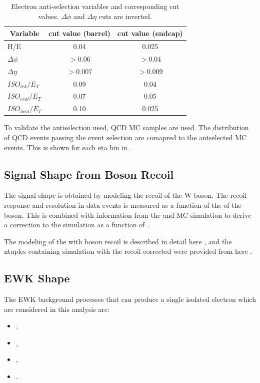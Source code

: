 \begin{table}[htbp]
  \begin{center}
    \leavevmode
    \begin{tabular}{lcc} 
    \toprule
      \multicolumn{1}{c}{Variable} & \multicolumn{1}{c}{cut value (barrel)}& \multicolumn{1}{c}{cut value (endcap)}\\\midrule
        H/E & 0.04 & 0.025 \\
        $\Delta\phi$ & $>0.06$  & $>0.04$ \\
        $\Delta\eta$ & $>0.007$ & $>0.009$\\
        $ISO_{trk} / E_T $ & 0.09 & 0.04 \\
        $ISO_{ecal}/ E_T$  & 0.07 & 0.05 \\
        $ISO_{hcal}/ E_T$  & 0.10 & 0.025\\ 
    \bottomrule
    \end{tabular}
    \caption{\label{tab:AScuts}Electron anti-selection variables and corresponding cut values. $\Delta\phi$ and $\Delta\eta$ cuts are inverted.}
  \end{center}
\end{table}

To validate the antiselection used, \ac{QCD} \ac{MC} samples are used. The
distribution of \ac{QCD} events passing the event selection are comapred to the
antselected MC events. This is shown for each eta bin in
.

\subsection{Signal \ETm Shape from Boson Recoil}
The signal \ETm shape is obtained by modeling the recoil of the W boson. 
The recoil response and resolution in \HepProcess{\PZ\to\Plepton\Plepton} data
events is measured as a function of the \pT of the boson. This is combined with
information from the \PW and \PZ \ac{MC} simulation to derive a correction to
the simulation \ETm as a function of \PW \pT.

The modeling of the \HepProcess{\PW\to\Plepton\Pnu} \ETm with boson recoil is
described in detail here \cite{NULL}, and the ntuples containing
\HepProcess{\PW\to\Pelectron\Pnu} simulation with the recoil corrected \ETm were
provided from here \cite{NULL}.


\subsection{\ac{EWK} \ETm Shape}
The EWK background processes that can produce a single isolated
electron which are considered in this analysis are:
\begin{itemize}
\item \HepProcess{\PZ\to\Pelectron\APelectron},
\item \HepProcess{\PZ\to\Ptauon\APtauon},
\item \HepProcess{\PW\to\Ptau\Pnu},
\item \HepProcess{\Ptop\APtop}.
\end{itemize}

